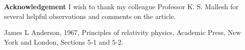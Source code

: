 \medskip
\noindent
\textbf{Acknowledgement} I wish to thank my colleague Professor K. S. Mallesh for several helpful observations and comments on the article.

\renewcommand{\bibname}{Reference}
\begin{thebibliography}{99}
 James L Anderson, 1967, Principles of relativity physics, Academic Press, New York and London, Sections 5-1 and 5-2.
\end{thebibliography}



